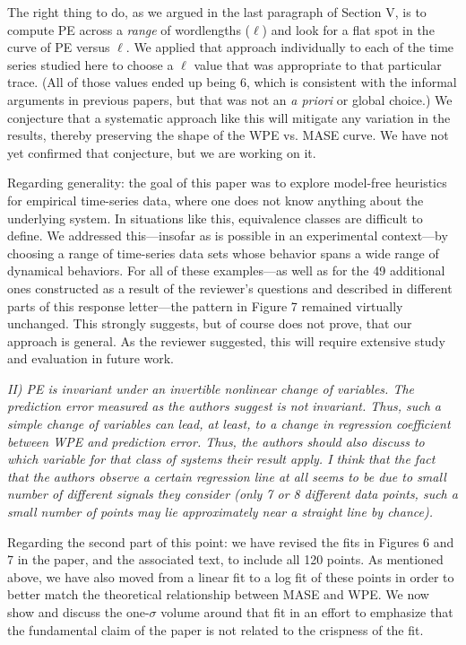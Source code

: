 \documentclass[12pt]{article}
\begin{document}
The right thing to do, as we argued in the last paragraph of Section
V, is to compute PE across a \emph{range} of wordlengths ($\ell$) and
look for a flat spot in the curve of PE versus $\ell$.  We applied
that approach individually to each of the time series studied here to
choose a $\ell$ value that was appropriate to that particular trace.
(All of those values ended up being 6, which is consistent with the
informal arguments in previous papers, but that was not an \emph{a
  priori} or global choice.)  We conjecture that a systematic approach
like this will mitigate any variation in the results, thereby
preserving the shape of the WPE vs. MASE curve.  We have not yet
confirmed that conjecture, but we are working on it.

Regarding generality: the goal of this paper was to explore model-free
heuristics for empirical time-series data, where one does not know
anything about the underlying system.  In situations like this,
equivalence classes are difficult to define.  We addressed
this---insofar as is possible in an experimental context---by choosing
a range of time-series data sets whose behavior spans a wide range of
dynamical behaviors.  For all of these examples---as well as for the
49 additional ones
constructed as a result of the reviewer's questions and described in
different parts of this response letter---the pattern in Figure 7
remained virtually unchanged.  This strongly suggests, but of course
does not prove, that our approach is general.  As the reviewer
suggested, this will require extensive study and evaluation in future
work.

\smallskip

\emph{II) PE is invariant under an invertible nonlinear change of
  variables. The prediction error measured as the authors suggest is
  not invariant. Thus, such a simple change of variables can lead, at
  least, to a change in regression coefficient between WPE and
  prediction error. Thus, the authors should also discuss to which
  variable for that class of systems their result apply. I think that
  the fact that the authors observe a certain regression line at all
  seems to be due to small number of different signals they consider
  (only 7 or 8 different data points, such a small number of points
  may lie approximately near a straight line by chance).}

Regarding the second part of this point: we have revised the fits in
Figures 6 and 7 in the paper, and the associated text, to include all
120 points.  As mentioned above, we have also moved from a linear fit
to a log fit of these points in order to better match the theoretical
relationship between MASE and WPE.  We now show and discuss the
one-$\sigma$ volume around that fit in an effort to emphasize that the
fundamental claim of the paper is not related to the crispness of the
fit.
\end{document}
